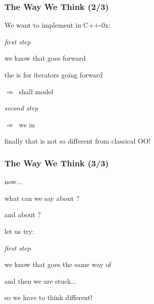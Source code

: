 \begin{frame}
  \frametitle{The Way We Think (2/3)}

We want to implement \bfarrayiteratorT in C++-0x:

\bigskip

\begin{enumerate}
{\scriptsize{

\item[] \textit{first step}
\smallskip
\item we know that \bfarrayiteratorT goes forward
\item the \bfForwardIterator {\color{red}{ concept}} is for iterators going forward
\item $\Rightarrow ~ $ \bfarrayiteratorT shall {\color{mediumgreen}{implicitly}} model \bfForwardIterator

\medskip
\item[] \textit{second step}
\smallskip

\item \bfForwardIterator {\color{red}{ requires}} \bfnext
\item $\Rightarrow ~ $ we {\color{red}{implement}} \bfnext in \bfarrayiteratorT

}}
\end{enumerate}

\bigskip

finally that is not so different from classical OO!

\end{frame}



\begin{frame}
  \frametitle{The Way We Think (3/3)}

now...

\medskip

what can we say about \bfhelloiteratorI?

\medskip

and about \bfreverseI?

\bigskip\medskip

let us try:

\medskip

\begin{enumerate}
{\scriptsize{

\item[] \textit{first step}
\smallskip
\item we know that \bfhelloiteratorI goes the same way of \bfI
\item and then we are stuck...
}}
\end{enumerate}

\bigskip\medskip

so we have to think different!

\end{frame}



